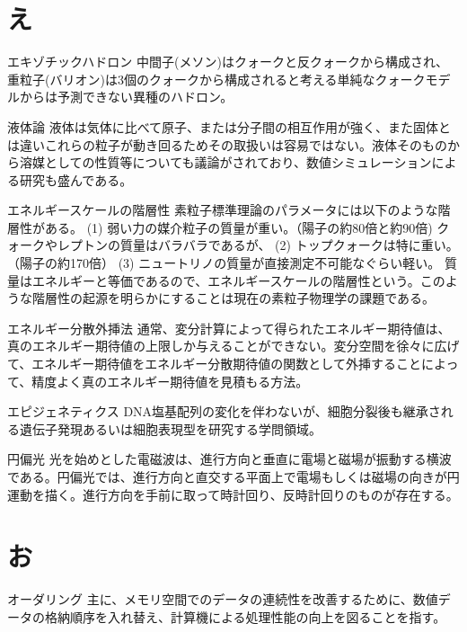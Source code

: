 \begin{用語集}
\section{え}
\item{エキゾチックハドロン}{}
{中間子(メソン)はクォークと反クォークから構成され、重粒子(バリオン)は3個のクォークから構成されると考える単純なクォークモデルからは予測できない異種のハドロン。}
\item{液体論}{}
{液体は気体に比べて原子、または分子間の相互作用が強く、また固体とは違いこれらの粒子が動き回るためその取扱いは容易ではない。液体そのものから溶媒としての性質等についても議論がされており、数値シミュレーションによる研究も盛んである。}
\item{エネルギースケールの階層性}{}
{素粒子標準理論のパラメータには以下のような階層性がある。 (1) 弱い力の媒介粒子の質量が重い。（陽子の約80倍と約90倍) クォークやレプトンの質量はバラバラであるが、 (2) トップクォークは特に重い。（陽子の約170倍） (3) ニュートリノの質量が直接測定不可能なぐらい軽い。 質量はエネルギーと等価であるので、エネルギースケールの階層性という。このような階層性の起源を明らかにすることは現在の素粒子物理学の課題である。}
\item{エネルギー分散外挿法}{}
{通常、変分計算によって得られたエネルギー期待値は、真のエネルギー期待値の上限しか与えることができない。変分空間を徐々に広げて、エネルギー期待値をエネルギー分散期待値の関数として外挿することによって、精度よく真のエネルギー期待値を見積もる方法。}
\item{エピジェネティクス}{}
{DNA塩基配列の変化を伴わないが、細胞分裂後も継承される遺伝子発現あるいは細胞表現型を研究する学問領域。}
\item{円偏光}{}
{光を始めとした電磁波は、進行方向と垂直に電場と磁場が振動する横波である。円偏光では、進行方向と直交する平面上で電場もしくは磁場の向きが円運動を描く。進行方向を手前に取って時計回り、反時計回りのものが存在する。}
\section{お}
\item{オーダリング}{}
{主に、メモリ空間でのデータの連続性を改善するために、数値データの格納順序を入れ替え、計算機による処理性能の向上を図ることを指す。}

\end{用語集}
